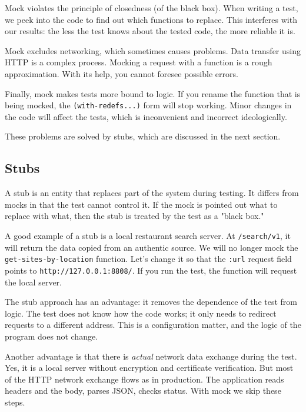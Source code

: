 Mock violates the principle of closedness (of the black box). When writing a test, we peek into the code to find out which functions to replace. This interferes with our results: the less the test knows about the tested code, the more reliable it is.

Mock excludes networking, which sometimes causes problems. Data transfer using HTTP is a complex process. Mocking a request with a function is a rough approximation. With its help, you cannot foresee possible errors.

Finally, mock makes tests more bound to logic. If you rename the function that is being mocked, the \verb|(with-redefs...)| form will stop working. Minor changes in the code will affect the tests, which is inconvenient and incorrect ideologically.

These problems are solved by stubs, which are discussed in the next section.

\subsection{Stubs}


A stub is an entity that replaces part of the system during testing. It differs from mocks in that the test cannot control it. If the mock is pointed out what to replace with what, then the stub is treated by the test as a "black box."

A good example of a stub is a local restaurant search server. At \verb|/search/v1|, it will return the data copied from an authentic source. We will no longer mock the \verb|get-sites-by-location| function. Let's change it so that the \verb|:url| request field points to \verb|http://127.0.0.1:8808/|. If you run the test, the function will request the local server.

The stub approach has an advantage: it removes the dependence of the test from logic. The test does not know how the code works; it only needs to redirect requests to a different address. This is a configuration matter, and the logic of the program does not change.

Another advantage is that there is \emph{actual} network data exchange during the test. Yes, it is a local server without encryption and certificate verification. But most of the HTTP network exchange flows as in production. The application reads headers and the body, parses JSON, checks status. With mock we skip these steps.


